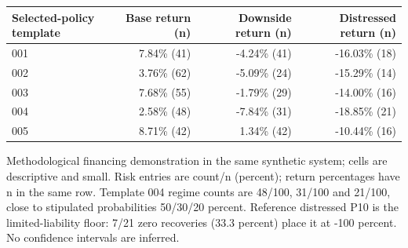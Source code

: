 \begin{table}[htbp]
\begin{tabular}{lrrr}
\toprule
Selected-policy template & Base return (n) & Downside return (n) & Distressed return (n) \\
\midrule
001 & 7.84\% (41) & -4.24\% (41) & -16.03\% (18) \\
002 & 3.76\% (62) & -5.09\% (24) & -15.29\% (14) \\
003 & 7.68\% (55) & -1.79\% (29) & -14.00\% (16) \\
004 & 2.58\% (48) & -7.84\% (31) & -18.85\% (21) \\
005 & 8.71\% (42) & 1.34\% (42) & -10.44\% (16) \\
\bottomrule
\end{tabular}
\par\smallskip
\begin{minipage}{\linewidth}\footnotesize Methodological financing demonstration in the same synthetic system; cells are descriptive and small. Risk entries are count/n (percent); return percentages have n in the same row. Template 004 regime counts are 48/100, 31/100 and 21/100, close to stipulated probabilities 50/30/20 percent. Reference distressed P10 is the limited-liability floor: 7/21 zero recoveries (33.3 percent) place it at -100 percent. No confidence intervals are inferred.\end{minipage}
\end{table}
